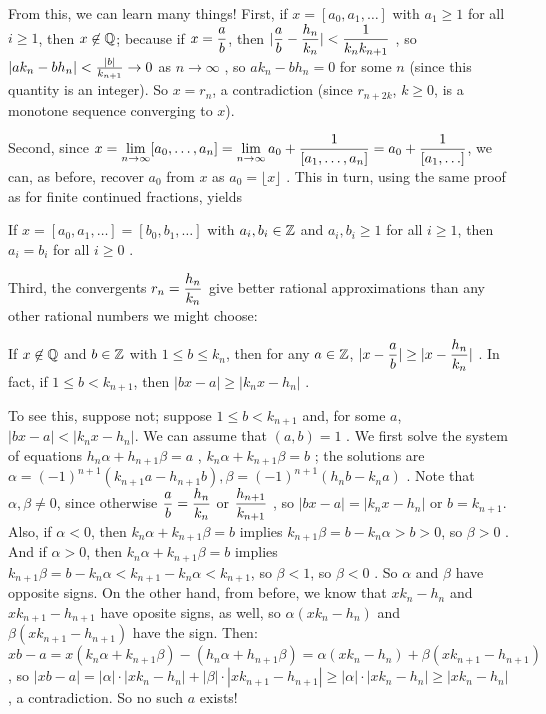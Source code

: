 \ssk

From this, we can learn many things! First, if $x=[a_0,a_1,\ldots]$ with $a_1\geq 1$ for all $i\geq 1$, then 
$x\not\in{\Bbb Q}$; because if $\displaystyle x={{a}\over{b}}$, then 
$\displaystyle |{{a}\over{b}}-{{h_n}\over{k_n}}|< {{1}\over{k_n k_{n+1}}}$ , so 
$|ak_n-bh_n| < {{|b|}\over{k_{n+1}}} \rightarrow 0$  as $n\rightarrow\infty$ , so $ak_n-bh_n=0$ for some
$n$ (since this quantity is an integer). So $x=r_n$, a contradiction (since $r_{n+2k}$, $k\geq 0$, is a monotone 
sequence converging to $x$).

\ssk

Second, since $\displaystyle x=\lim_{n\rightarrow \infty} [a_0,\ldots ,a_n] = 
\lim_{n\rightarrow \infty} a_0+{{1}\over{[a_1,\ldots ,a_n]}} = a_0+{{1}\over{[a_1,\ldots ]}}$, we
can, as before, recover $a_0$ from $x$ as $a_0=\lfloor x\rfloor$ . This in turn, using the same
proof as for finite continued fractions, yields

\ssk

If $x=[a_0,a_1,\ldots] = [b_0,b_1,\ldots]$ with $a_i,b_i\in{\Bbb Z}$ and $a_i,b_i\geq 1$ for all $i\geq 1$,
then $a_i=b_i$ for all $i\geq 0$ .

\ssk

Third, the convergents $\displaystyle r_n = {{h_n}\over{k_n}}$ give better rational approximations than
any other rational numbers we might choose:

If $x\not\in{\Bbb Q}$ and $b\in{\Bbb Z}$ with $1\leq b\leq k_n$, then for 
any $a\in{\Bbb Z}$, $\displaystyle |x-{{a}\over{b}}| \geq |x-{{h_n}\over{k_n}}|$ . In fact,
if $1\leq b < k_{n+1}$, then $|bx-a|\geq|k_n x-h_n|$ . 

\ssk

To see this, suppose not; suppose 
$1\leq b< k_{n+1}$ and, for some $a$, $|bx-a| < |k_n x-h_n|$. We can assume that $(a,b)=1$ . 
We first solve the system of equations 
$h_n\alpha +h_{n+1}\beta = a$ , $k_n\alpha +k_{n+1}\beta = b$ ;
the solutions are $\alpha = (-1)^{n+1}(k_{n+1}a-h_{n+1}b) , \beta = (-1)^{n+1}(h_n b-k_n a)$ . 
Note that $\alpha,\beta\neq 0$, since otherwise $\displaystyle {{a}\over{b}} = {{h_n}\over{k_n}}$ 
or $\displaystyle {{h_{n+1}}\over{k_{n+1}}}$ , so $|bx-a| = |k_n x-h_n|$ or $b = k_{n+1}$.
Also, if $\alpha<0$, then $k_n\alpha +k_{n+1}\beta = b$ implies $k_{n+1}\beta = b-k_n\alpha>b>0$, 
so $\beta >0$ . 
And if $\alpha>0$, then $k_n\alpha +k_{n+1}\beta = b$ implies 
$k_{n+1}\beta = b - k_n\alpha < k_{n+1}-k_n\alpha<k_{n+1}$, so $\beta<1$, so $\beta <0$ .
So $\alpha$ and $\beta$ have opposite signs. On the other hand, from before, we know 
that $xk_n-h_n$ and $xk_{n+1}-h_{n+1}$ have oposite signs, as well, so
$\alpha(xk_n-h_n)$ and $\beta(xk_{n+1}-h_{n+1})$ have the 
sign. Then:
\hhsk
$xb-a = x(k_n\alpha +k_{n+1}\beta) -(h_n\alpha +h_{n+1}\beta) = 
\alpha(xk_n-h_n) + \beta(xk_{n+1}-h_{n+1})$ , so
$|xb-a| = |\alpha|\cdot|xk_n-h_n| + |\beta|\cdot|xk_{n+1}-h_{n+1}| \geq
|\alpha|\cdot|xk_n-h_n| \geq |xk_n-h_n|$ , a contradiction. So no such $a$ exists!


